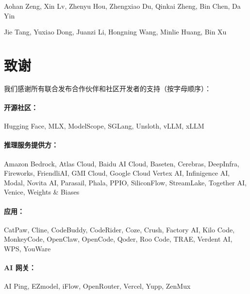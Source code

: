 Aohan Zeng, Xin Lv, Zhenyu Hou, Zhengxiao Du, Qinkai Zheng, Bin Chen, Da Yin

Jie Tang, Yuxiao Dong, Juanzi Li, Hongning Wang, Minlie Huang, Bin Xu


\section*{致谢}

我们感谢所有联合发布合作伙伴和社区开发者的支持（按字母顺序）：

\paragraph{开源社区：} Hugging Face, MLX, ModelScope, SGLang, Unsloth, vLLM, xLLM

\paragraph{推理服务提供方：} Amazon Bedrock, Atlas Cloud, Baidu AI Cloud, Baseten, Cerebras, DeepInfra, Fireworks, FriendliAI, GMI Cloud, Google Cloud Vertex AI, Infinigence AI, Modal, Novita AI, Parasail, Phala, PPIO, SiliconFlow, StreamLake, Together AI, Venice, Weights \& Biases

\paragraph{应用：} CatPaw, Cline, CodeBuddy, CodeRider, Coze, Crush, Factory AI, Kilo Code, MonkeyCode, OpenClaw, OpenCode, Qoder, Roo Code, TRAE, Verdent AI, WPS, YouWare

\paragraph{AI 网关：} AI Ping, EZmodel, iFlow, OpenRouter, Vercel, Yupp, ZenMux
